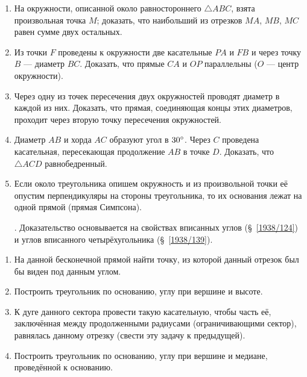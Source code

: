 {\begin{enumerate}
\item
На окружности, описанной около равностороннего $\triangle ABC$, взята произвольная точка $M$;
доказать, что наибольший из отрезков $MA$, $MB$, $MC$ равен сумме двух остальных.

\item
Из точки $F$ проведены к окружности две касательные $PA$ и $FB$ и через точку $B$ — диаметр $BC$.
Доказать, что прямые $CA$ и $OP$ параллельны ($O$ — центр окружности).

\item
Через одну из точек пересечения двух окружностей проводят диаметр в каждой из них.
Доказать, что прямая, соединяющая концы этих диаметров, проходит через вторую точку пересечения окружностей.

\item
Диаметр $AB$ и хорда $AC$ образуют угол в $30\degree$.
Через $C$ проведена касательная, пересекающая продолжение $AB$ в точке $D$.
Доказать, что $\triangle ACD$ равнобедренный.

\item
Если около треугольника опишем окружность и из произвольной точки её опустим перпендикуляры на стороны треугольника, то их основания лежат на одной прямой (прямая Симпсона).

\smallskip
{}.
Доказательство основывается на свойствах вписанных углов (§~\ref{1938/124}) и углов вписанного четырёхугольника (§~\ref{1938/139}).


\end{enumerate}

\begin{center}
\end{center}

\begin{enumerate}

\item
На данной бесконечной прямой найти точку, из которой данный отрезок был бы виден под данным углом.

\item
Построить треугольник по основанию, углу при вершине и высоте.

\item
К дуге данного сектора провести такую касательную, чтобы часть её, заключённая между продолженными радиусами (ограничивающими сектор), равнялась данному отрезку (свести эту задачу к предыдущей).

\item
Построить треугольник по основанию, углу при вершине и медиане, проведённой к основанию.


\end{enumerate}}
